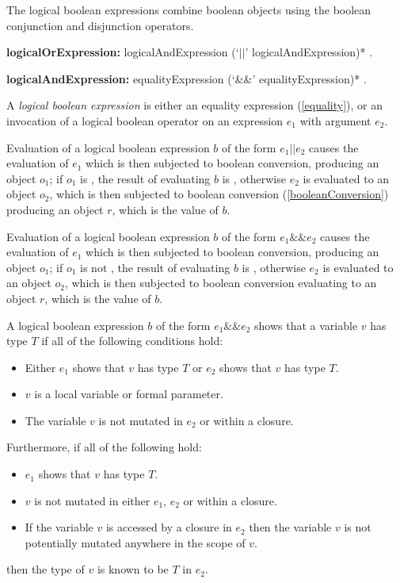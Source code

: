 \documentclass{article}
\begin{document}
\LMHash{}
The logical boolean expressions combine boolean objects using the boolean conjunction and disjunction operators.

\begin{grammar}
{\bf logicalOrExpression:}
      logicalAndExpression (`$||$' logicalAndExpression)*
    .


{\bf logicalAndExpression:}
      equalityExpression (`\&\&' equalityExpression)*
    .
 \end{grammar}

\LMHash{}
A {\em logical boolean expression} is either an equality expression (\ref{equality}), or an invocation of a logical boolean operator on an expression $e_1$ with argument $e_2$.

\LMHash{}
Evaluation of a logical boolean expression $b$ of the form $e_1 || e_2$ causes the evaluation of $e_1$ which is then  subjected to boolean conversion, producing an object $o_1$; if $o_1$ is \TRUE, the result of evaluating $b$ is \TRUE, otherwise $e_2$ is evaluated to an object $o_2$, which is then subjected to boolean conversion (\ref{booleanConversion}) producing an object $r$, which is the value of $b$.

\LMHash{}
Evaluation of a logical boolean expression $b$ of the form $e_1 \&\& e_2$ causes the evaluation of $e_1$ which is then subjected to boolean conversion, producing an object $o_1$; if $o_1$ is not  \TRUE, the result of evaluating $b$ is \FALSE, otherwise $e_2$ is evaluated to an object $o_2$, which is then subjected to boolean conversion evaluating to an object $r$, which is the value of $b$.

\LMHash{}
A logical boolean expression $b$ of the form $e_1 \&\& e_2$ shows that a variable $v$ has type
$T$ if all of the following conditions hold:
\begin{itemize}
\item Either $e_1$ shows that $v$ has type $T$ or $e_2$ shows that $v$ has type $T$.
\item $v$ is a local variable or formal parameter.
\item The variable $v$ is not mutated in $e_2$ or within a closure.
\end{itemize}

\LMHash{}
Furthermore, if all of the following hold:
\begin{itemize}
\item $e_1$ shows that $v$ has type $T$.
\item $v$ is not mutated in either $e_1$, $e_2$ or within a closure.
\item If the variable $v$ is accessed by a closure in $e_2$ then the variable $v$ is not potentially mutated anywhere in the scope of $v$.
\end{itemize}
then the type of $v$ is known to be $T$ in $e_2$.
\end{document}
